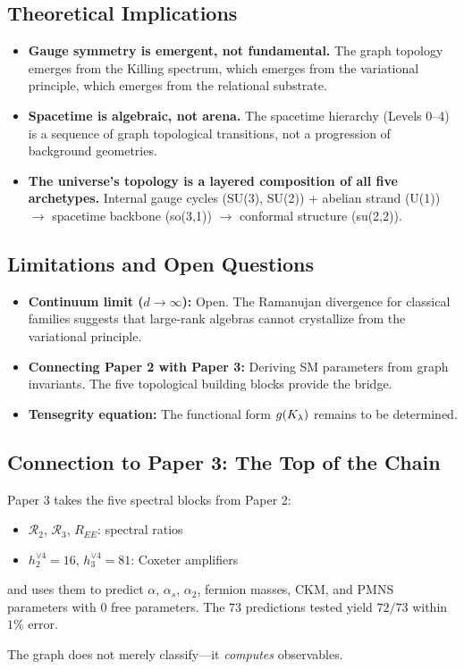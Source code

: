 \subsection{Theoretical Implications}\label{sec:implications}

\begin{itemize}
    \item \textbf{Gauge symmetry is emergent, not fundamental.} The graph topology emerges from the Killing spectrum, which emerges from the variational principle, which emerges from the relational substrate.
    
    \item \textbf{Spacetime is algebraic, not arena.} The spacetime hierarchy (Levels 0--4) is a sequence of graph topological transitions, not a progression of background geometries.
    
    \item \textbf{The universe's topology is a layered composition of all five archetypes.} Internal gauge cycles (SU(3), SU(2)) + abelian strand (U(1)) $\to$ spacetime backbone (so(3,1)) $\to$ conformal structure (su(2,2)).
\end{itemize}

\subsection{Limitations and Open Questions}\label{sec:limitations}

\begin{itemize}
    \item \textbf{Continuum limit ($d \to \infty$):} Open. The Ramanujan divergence for classical families suggests that large-rank algebras cannot crystallize from the variational principle.
    
    \item \textbf{Connecting Paper 2 with Paper 3:} Deriving SM parameters from graph invariants. The five topological building blocks provide the bridge.
    
    \item \textbf{Tensegrity equation:} The functional form $g(K_\lambda)$ remains to be determined.
\end{itemize}

\subsection{Connection to Paper 3: The Top of the Chain}\label{sec:paper3_connection}

Paper 3 takes the five spectral blocks from Paper 2:
\begin{itemize}
    \item $\mathcal{R}_2$, $\mathcal{R}_3$, $R_{EE}$: spectral ratios
    \item $h_2^{\vee 4} = 16$, $h_3^{\vee 4} = 81$: Coxeter amplifiers
\end{itemize}

and uses them to predict $\alpha$, $\alpha_s$, $\alpha_2$, fermion masses, CKM, and PMNS parameters with $0$ free parameters. The $73$ predictions tested yield $72/73$ within $1\%$ error.

The graph does not merely classify---it \emph{computes} observables.
